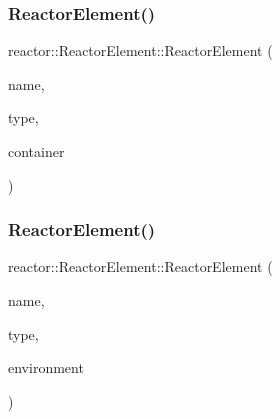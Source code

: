 \subsubsection{\texorpdfstring{Reactor\+Element()}{ReactorElement()}\hspace{0.1cm}{\footnotesize\ttfamily [1/4]}}
{\footnotesize\ttfamily reactor\+::\+Reactor\+Element\+::\+Reactor\+Element (\begin{DoxyParamCaption}\item[{const std\+::string \&}]{name,  }\item[{\hyperlink{classreactor_1_1ReactorElement_a9291659e2893372cfea42ffccfd487b2}{Reactor\+Element\+::\+Type}}]{type,  }\item[{\hyperlink{classreactor_1_1Reactor}{Reactor} $\ast$}]{container }\end{DoxyParamCaption})}

\mbox{\label{classreactor_1_1ReactorElement_ac5f85a8322de3fad7191a8f749b507fd}} 
\subsubsection{\texorpdfstring{Reactor\+Element()}{ReactorElement()}\hspace{0.1cm}{\footnotesize\ttfamily [2/4]}}
{\footnotesize\ttfamily reactor\+::\+Reactor\+Element\+::\+Reactor\+Element (\begin{DoxyParamCaption}\item[{const std\+::string \&}]{name,  }\item[{\hyperlink{classreactor_1_1ReactorElement_a9291659e2893372cfea42ffccfd487b2}{Reactor\+Element\+::\+Type}}]{type,  }\item[{\hyperlink{classreactor_1_1Environment}{Environment} $\ast$}]{environment }\end{DoxyParamCaption})}

\mbox{\label{classreactor_1_1ReactorElement_ac9075040ad83b1945f75f3065c0405fa}} 
